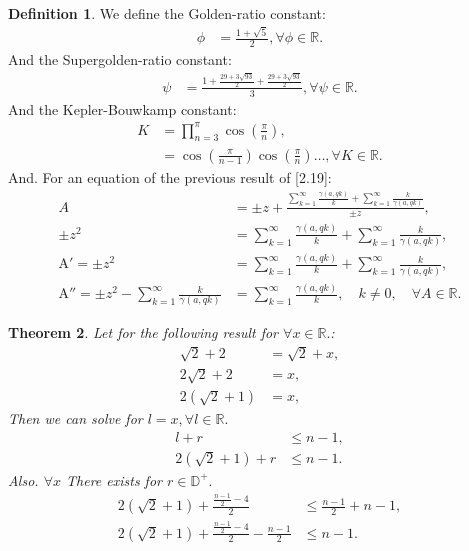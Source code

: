 \documentclass[10pt]{article}
\theoremstyle{plain}
\newtheorem{theorem}{Theorem}[section]
\theoremstyle{definition}
\newtheorem{definition}[theorem]{Definition}
\theoremstyle{remark}
\begin{document}
\begin{definition}
	We define the Golden-ratio constant:
	\begin{align*}
		\phi &= \frac{1+\sqrt{5}}{2}, \forall \phi \in \mathbb{R}.
	\end{align*}
	And the Supergolden-ratio constant:
	\begin{align*}
		\psi &= \frac{1+\frac{29+3\sqrt{93}}{2}+\frac{29+3\sqrt{93}}{2}}{3}, \forall \psi \in \mathbb{R}.
	\end{align*}
	And the Kepler-Bouwkamp constant:
	\begin{align*}
		K &= \prod_{n=3}^{\pi} \cos(\frac{\pi}{n}),\\
		&= \cos(\frac{\pi}{n-1}) \cos(\frac{\pi}{n}) \dots, \forall K \in \mathbb{R}.
	\end{align*}
	And. For an equation of the previous result of [2.19]:
	\begin{align*}
		A &= \pm z + \frac{\sum_{k=1}^{\infty} \frac{\gamma(a, qk)}{k} + \sum_{k=1}^{\infty}\frac{k}{\gamma(a, qk)}}{\pm z},\\
		\pm z^2 &= \sum_{k=1}^{\infty} \frac{\gamma(a, qk)}{k} + \sum_{k=1}^{\infty}\frac{k}{\gamma(a, qk)},\\
		\mathrm{A}' = \pm z^2 &= \sum_{k=1}^{\infty} \frac{\gamma(a, qk)}{k} + \sum_{k=1}^{\infty}\frac{k}{\gamma(a, qk)},\\
		\mathrm{A}'' = \pm z^{2} - \sum_{k=1}^{\infty}\frac{k}{\gamma(a, qk)} &= \sum_{k=1}^{\infty} \frac{\gamma(a, qk)}{k}, \quad k \neq 0, \quad \forall A \in \mathbb{R}.
	\end{align*}
\end{definition}

\begin{theorem}
	Let for the following result for $\forall x \in \mathbb{R}.$:
	\begin{align*}
		\sqrt{2}+2&=\sqrt{2} + x,\\
		2\sqrt{2}+2 &=x,\\
		2(\sqrt{2} + 1) &= x,
	\end{align*}
	Then we can solve for $l=x, \forall l \in \mathbb{R}.$
	\begin{align*}
		l + r &\leq n - 1,\\
		2(\sqrt{2} + 1) + r &\leq n - 1.
	\end{align*}
	Also. $\forall x$ There exists for $r \in \mathbb{D}^{+}.$
	\begin{align*}
		2(\sqrt{2} + 1) + \frac{\frac{n - 1}{2} - 4}{2}  &\leq \frac{n - 1}{2} + n - 1,\\
		2(\sqrt{2} + 1) + \frac{\frac{n - 1}{2} - 4}{2} - \frac{n - 1}{2} &\leq n - 1.
	\end{align*}
\end{theorem}
\end{document}
